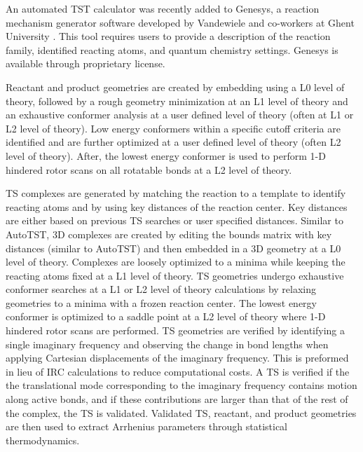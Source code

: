 \documentclass[preprint, 11pt]{elsarticle} %
\begin{document}
An automated TST calculator was recently added to Genesys, a reaction mechanism generator software developed by Vandewiele and co-workers at Ghent University \cite{VANDEVIJVER:2018, vandewiele:2012}. 
This tool requires users to provide a description of the reaction family, identified reacting atoms, and quantum chemistry settings.
Genesys is available through proprietary license.

Reactant and product geometries are created by embedding using a L0 level of theory, followed by a rough geometry minimization at an L1 level of theory and an exhaustive conformer analysis at a user defined level of theory (often at L1 or L2 level of theory).
Low energy conformers within a specific cutoff criteria are identified and are further optimized at a user defined level of theory (often L2 level of theory).
After, the lowest energy conformer is used to perform 1-D hindered rotor scans on all rotatable bonds at a L2 level of theory.

TS complexes are generated by matching the reaction to a template to identify reacting atoms and by using key distances of the reaction center. 
Key distances are either based on previous TS searches or user specified distances.
Similar to AutoTST, 3D complexes are created by editing the bounds matrix with key distances (similar to AutoTST) and then embedded in  a 3D geometry at a L0 level of theory.
Complexes are loosely optimized to a minima while keeping the reacting atoms fixed at a L1 level of theory.
TS geometries undergo exhaustive conformer searches at a L1 or L2 level of theory calculations by relaxing geometries to a minima with a frozen reaction center.
The lowest energy conformer is optimized to a saddle point at a L2 level of theory where 1-D hindered rotor scans are performed. 
TS geometries are verified by identifying a single imaginary frequency and observing the change in bond lengths when applying Cartesian displacements of the imaginary frequency.
This is preformed in lieu of  IRC calculations to reduce computational costs.
A TS is verified if the the translational mode corresponding to the imaginary frequency contains motion along active bonds, and if these contributions are larger than that of the rest of the complex, the TS is validated. 
Validated TS, reactant, and product geometries are then used to extract Arrhenius parameters through statistical thermodynamics.
\end{document}
